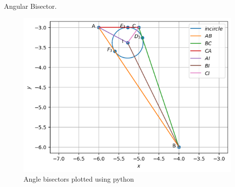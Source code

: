 \begin{table}[H]
        \caption{Angular Bisector.}
        \centering
        
\end{table}
\begin{figure}[H]
\includegraphics[width=\columnwidth]{1.5/figs/1.5.png}
\caption{Angle bisectors plotted using python}
\label{fig:i_1.5_py}
\end{figure}

